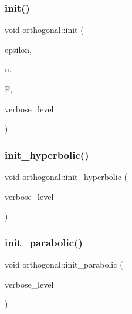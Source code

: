 \subsubsection{\texorpdfstring{init()}{init()}}
{\footnotesize\ttfamily void orthogonal\+::init (\begin{DoxyParamCaption}\item[{\mbox{\hyperlink{galois_8h_a09fddde158a3a20bd2dcadb609de11dc}{I\+NT}}}]{epsilon,  }\item[{\mbox{\hyperlink{galois_8h_a09fddde158a3a20bd2dcadb609de11dc}{I\+NT}}}]{n,  }\item[{\mbox{\hyperlink{classfinite__field}{finite\+\_\+field}} $\ast$}]{F,  }\item[{\mbox{\hyperlink{galois_8h_a09fddde158a3a20bd2dcadb609de11dc}{I\+NT}}}]{verbose\+\_\+level }\end{DoxyParamCaption})}

\mbox{\label{classorthogonal_a29b6dc8054efd05033b2ef9cacca3a5e}} 
\subsubsection{\texorpdfstring{init\+\_\+hyperbolic()}{init\_hyperbolic()}}
{\footnotesize\ttfamily void orthogonal\+::init\+\_\+hyperbolic (\begin{DoxyParamCaption}\item[{\mbox{\hyperlink{galois_8h_a09fddde158a3a20bd2dcadb609de11dc}{I\+NT}}}]{verbose\+\_\+level }\end{DoxyParamCaption})}

\mbox{\label{classorthogonal_aef84a93f2f8973a3b5fc2d7d48b1d5ed}} 
\subsubsection{\texorpdfstring{init\+\_\+parabolic()}{init\_parabolic()}}
{\footnotesize\ttfamily void orthogonal\+::init\+\_\+parabolic (\begin{DoxyParamCaption}\item[{\mbox{\hyperlink{galois_8h_a09fddde158a3a20bd2dcadb609de11dc}{I\+NT}}}]{verbose\+\_\+level }\end{DoxyParamCaption})}

